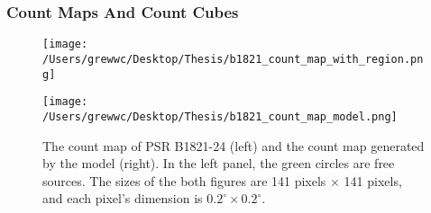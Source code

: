 \documentclass[12pt]{report}
\newcommand{\mycaption}[1]{\protect \caption{#1}}
\begin{document}
              \subsubsection{Count Maps And Count Cubes}
                \begin{figure}[!ht]
                  \begin{center}
                  \begin{minipage}{0.45\textwidth}
                    \begin{center} 
                      \texttt{[image: /Users/grewwc/Desktop/Thesis/b1821\_count\_map\_with\_region.png]}
                    \end{center}
                  \end{minipage}
                  \begin{minipage}{0.45\textwidth}
                    \begin{center}
                      \texttt{[image: /Users/grewwc/Desktop/Thesis/b1821\_count\_map\_model.png]}
                    \end{center}
                  \end{minipage}
                \end{center}
                \mycaption{The count map of PSR B1821-24 (left) and the count map generated by the 
                model (right). In the left panel, the green circles are free sources. The sizes of the both 
                figures are 141 pixels $\times$ 141 pixels, and each pixel's dimension is 
                $0.2^\circ \times 0.2^\circ$.}
                \label{fig: b1821_count_map_with_region_and_model}
              \end{figure}
            
\end{document}
